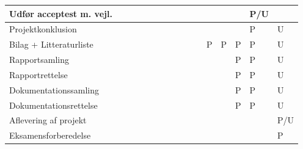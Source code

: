 \documentclass[landscape, 12pt, letterpaper]{article}
\begin{document}
\begin{table}[]
\begin{tabular}{|l|l|l|l|l|l|l|l|l|l|l|l|l|l|l|l|}
Udfør acceptest m. vejl.&    &    &    &    &    &    &    &    &    &    &    &    &    & P/U&    \\ \hline
Projektkonklusion       &    &    &    &    &    &    &    &    &    &    &    &    &    & P  &  U \\ \hline
Bilag + Litteraturliste &    &    &    &    &    &    &    &    &    &    &  P & P  &  P &  P &  U \\ \hline
Rapportsamling          &    &    &    &    &    &    &    &    &    &    &    &    &  P &  P &  U \\ \hline
Rapportrettelse         &    &    &    &    &    &    &    &    &    &    &    &    & P  &  P &  U \\ \hline
Dokumentationssamling   &    &    &    &    &    &    &    &    &    &    &    &    &  P &  P &  U \\ \hline
Dokumentationsrettelse  &    &    &    &    &    &    &    &    &    &    &    &    &  P &  P &  U \\ \hline
Aflevering af projekt   &    &    &    &    &    &    &    &    &    &    &    &    &    &    & P/U \\ \hline
Eksamensforberedelse    &    &    &    &    &    &    &    &    &    &    &    &    &    &    &  P \\ \hline

\end{tabular}
\end{table}
\end{document}

